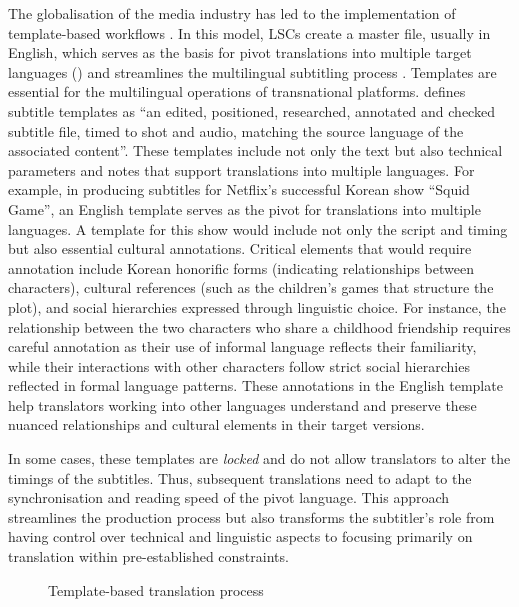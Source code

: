 \documentclass[output=paper]{langscibook}
\begin{document}
The globalisation of the media industry has led to the implementation of template\hyp based workflows \citep{georgakopoulou2019template}. In this model, LSCs create a master file, usually in English, which serves as the basis for pivot translations into multiple target languages () and streamlines the multilingual subtitling process \citep{Valdezetal2023}. Templates are essential for the multilingual operations of transnational platforms. \citet{netflix2022styleguide} defines subtitle templates as “an edited, positioned, researched, annotated and checked subtitle file, timed to shot and audio, matching the source language of the associated content”. These templates include not only the text but also technical parameters and notes that support translations into multiple languages. For example, in producing subtitles for Netflix’s successful Korean show “Squid Game”, an English template serves as the pivot for translations into multiple languages. A template for this show would include not only the script and timing but also essential cultural annotations. Critical elements that would require annotation include Korean honorific forms (indicating relationships between characters), cultural references (such as the children’s games that structure the plot), and social hierarchies expressed through linguistic choice. For instance, the relationship between the two characters who share a childhood friendship requires careful annotation as their use of informal language reflects their familiarity, while their interactions with other characters follow strict social hierarchies reflected in formal language patterns. These annotations in the English template help translators working into other languages understand and preserve these nuanced relationships and cultural elements in their target versions.

In some cases, these templates are \textit{locked} and do not allow translators to alter the timings of the subtitles. Thus, subsequent translations need to adapt to the synchronisation and reading speed of the pivot language. This approach streamlines the production process but also transforms the subtitler’s role from having control over technical and linguistic aspects to focusing primarily on translation within pre-established constraints.

\begin{figure}
\small
{}
\caption{Template-based translation process}
\label{fig:9:2}
\end{figure}
\end{document}

